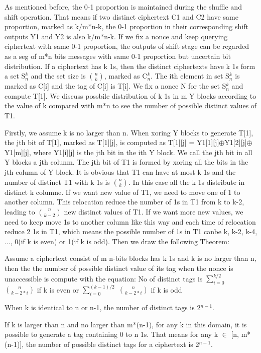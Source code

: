 As mentioned before, the 0-1 proportion is maintained during the shuffle and shift operation. That means if two distinct ciphertext C1 and C2 have same proportion, marked as k/m*n-k, the 0-1 proportion in their corresponding shift outputs Y1 and Y2 is also k/m*n-k.  
If we fix a nonce and keep querying ciphertext with same 0-1 proportion, the outputs of shift stage can be regarded as a seg of m*n bits messages with same 0-1 proportion but uncertain bit distribution. If a ciphertext has k 1s, then the distinct ciphertexts have k 1s form a set S$_{n}^{k}$ and the set size is $\binom{n}{k}$, marked as C$_{n}^{k}$. The ith element in set S$_{n}^{k}$ is marked as C[i] and the tag of C[i] is T[i].   
We fix a nonce N for the set S$_{n}^{k}$ and compute T[1]. We discuss possbile distribution of k 1s in m Y blocks according to the value of k compared with m*n to see the number of possible distinct values of T1. 

Firstly, we assume k is no larger than n. When xoring Y blocks to generate T[1], the jth bit of T[1], marked as T[1][j], is computed as T[1][j] = Y1[1][j]$\oplus$Y1[2][j]$\oplus$Y1[m][j], where Y1[i][j] is the jth bit in the ith Y block. We call the jth bit in all Y blocks a jth colunm. The jth bit of T1 is formed by xoring all the bits in the jth column of Y block.  It is obvious that T1 can have at most k 1s and the number of distinct T1 with k 1s is $\binom{n}{k}$. In this case all the k 1s distribute in distinct k columne.  If we want new value of T1, we need to move one of 1 to another column. This relocation reduce the number of 1s in T1 from k to k-2, leading to $\binom{n}{k-2}$ new distinct values of T1. If we want more new values, we need to keep move 1s to another column like this way and each time of relocation reduce 2 1s in T1, which means the possible number of 1s in T1 canbe k, k-2, k-4,$\ldots$, 0(if k is even) or 1(if k is odd). Then we draw the following Theorem:
\begin{theorem}
Assume a ciphertext consist of m n-bits blocks has k 1s and k is no larger than n, then the the number of possible distinct value of its tag when the nonce is unaccessible is compute with the equation:
No of distinct tags is $\sum_{i=0}^{k/2}$ $\binom{n}{k-2*i}$ if k is even or $\sum_{i=0}^{(k-1)/2}$ $\binom{n}{k-2*i}$ if k is odd
\end{theorem}
When k is identical to n or n-1, the number of distinct tags is 2$^{n-1}$.  

If k is larger than n and no larger than m*(n-1), for any k in this domain, it is possible to generate a tag containing 0 to n 1s. That means for any k $\in$ [n, m*(n-1)], the number of possible distinct tags for a ciphertext is 2$^{n-1}$. 

